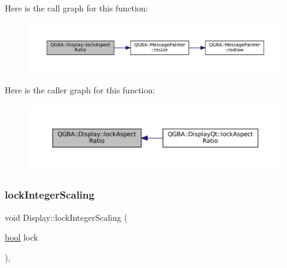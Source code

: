 Here is the call graph for this function\+:
\nopagebreak
\begin{figure}[H]
\begin{center}
\leavevmode
\includegraphics[width=350pt]{class_q_g_b_a_1_1_display_acad5a30d192f9207376208534036bbaa_cgraph}
\end{center}
\end{figure}
Here is the caller graph for this function\+:
\nopagebreak
\begin{figure}[H]
\begin{center}
\leavevmode
\includegraphics[width=350pt]{class_q_g_b_a_1_1_display_acad5a30d192f9207376208534036bbaa_icgraph}
\end{center}
\end{figure}
\mbox{\label{class_q_g_b_a_1_1_display_a3d51766ed958524a3ba87a19ecc2f4f6}} 
\subsubsection{\texorpdfstring{lock\+Integer\+Scaling}{lockIntegerScaling}}
{\footnotesize\ttfamily void Display\+::lock\+Integer\+Scaling (\begin{DoxyParamCaption}\item[{\mbox{\hyperlink{libretro_8h_a4a26dcae73fb7e1528214a068aca317e}{bool}}}]{lock }\end{DoxyParamCaption})\hspace{0.3cm}{\ttfamily [virtual]}, {\ttfamily [slot]}}

